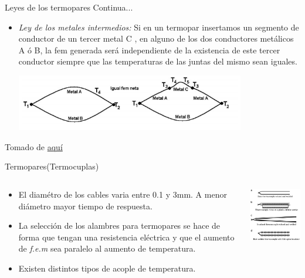 \documentclass[aspectratio=169]{beamer}
\begin{document}
\begin{frame}{Leyes de los termopares}
    Continua...\\[8pt]
    \begin{itemize}
        \item \emph{Ley de los metales intermedios: } Si en un termopar insertamos un segmento de conductor de un tercer metal C , en alguno de los dos conductores metálicos A ó B, la fem generada será independiente de la existencia de este tercer conductor siempre que las temperaturas de las juntas del mismo sean iguales. 
        \begin{center}
            \includegraphics[width=10cm]{fig/ley3.PNG}
        \end{center}
    \end{itemize}
    \tiny{Tomado de \href{http://laboratorios.fi.uba.ar/lscm/termocuplas01.pdf}{aquí}}
\end{frame}
\begin{frame}{Termopares(Termocuplas)}
    \begin{columns}[c, onlytextwidth]
        \begin{column}{0.45\textwidth}
            \begin{itemize}
                \item El diamétro de los cables varia entre 0.1 y 3mm. A menor diámetro mayor tiempo de respuesta. 
                \item La selección de los alambres para termopares se hace de forma que tengan una resistencia eléctrica y que el aumento de \textit{f.e.m} sea paralelo al aumento de temperatura.
                \item Existen distintos tipos de acople de temperatura.
                
            \end{itemize}
        \end{column}
        \begin{column}{0.5\textwidth}
            \includegraphics[width=6cm]{fig/ensamble_termopar.PNG}
            \\ \cite{Fraden_2016}
        \end{column}
    \end{columns}
\end{frame}
\end{document}
